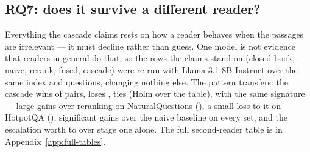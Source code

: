 \subsection{RQ7: does it survive a different reader?}
\label{sec:results-reader}

Everything the cascade claims rests on how a reader behaves when the
passages are irrelevant --- it must decline rather than guess. One model
is not evidence that readers in general do that, so the rows the claims
stand on (closed-book, naive, rerank, fused, cascade) were re-run with
Llama-3.1-8B-Instruct over the same index and questions, changing nothing
else. The pattern transfers: the cascade wins \ResultLlamaWins{} of
\ResultLlamaPairs{} pairs, loses \ResultLlamaLosses{}, ties
\ResultLlamaTies{} (Holm over the table), with the same signature ---
large gains over reranking on NaturalQuestions
(\RerankVsCascadeLlamaNQExactMatchDiff), a small loss to it on HotpotQA
(\RerankVsCascadeLlamaHotpotQAExactMatchDiff), significant gains over the
naive baseline on every set, and the escalation worth
\FusedVsCascadeLlamaNQExactMatchDiff{} to
\FusedVsCascadeLlamaTwoWikiExactMatchDiff{} over stage one alone. The
full second-reader table is in Appendix~\ref{app:full-tables}.
